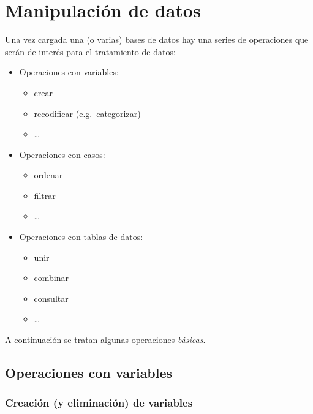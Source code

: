\documentclass[]{book}
\providecommand{\tightlist}{%
  \setlength{\itemsep}{0pt}\setlength{\parskip}{0pt}}
\begin{document}
\section{Manipulación de datos}\label{manipulaciuxf3n-de-datos}

Una vez cargada una (o varias) bases de datos hay una series de
operaciones que serán de interés para el tratamiento de datos:

\begin{itemize}
\tightlist
\item
  Operaciones con variables:

  \begin{itemize}
  \tightlist
  \item
    crear
  \item
    recodificar (e.g.~categorizar)
  \item
    \ldots{}
  \end{itemize}
\item
  Operaciones con casos:

  \begin{itemize}
  \tightlist
  \item
    ordenar
  \item
    filtrar
  \item
    \ldots{}
  \end{itemize}
\item
  Operaciones con tablas de datos:

  \begin{itemize}
  \tightlist
  \item
    unir
  \item
    combinar
  \item
    consultar
  \item
    \ldots{}
  \end{itemize}
\end{itemize}

A continuación se tratan algunas operaciones \emph{básicas}.

\subsection{Operaciones con variables}\label{operaciones-con-variables}

\subsubsection{Creación (y eliminación) de
variables}\label{creaciuxf3n-y-eliminaciuxf3n-de-variables}
\end{document}
